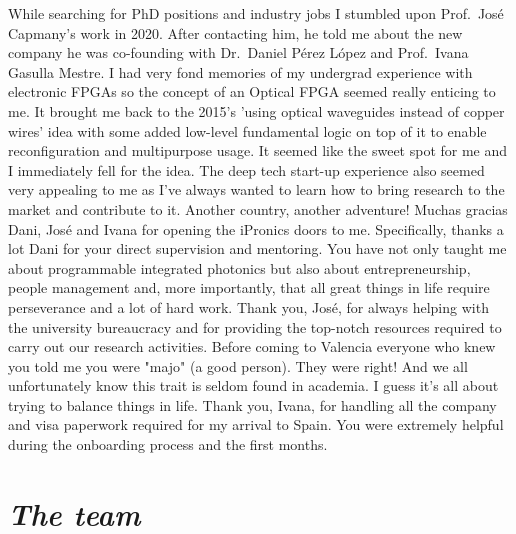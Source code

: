 While searching for PhD positions and industry jobs I stumbled upon Prof.~José Capmany's work in 2020.
After contacting him, he told me about the new company he was co-founding with Dr.~Daniel Pérez López and Prof.~Ivana Gasulla Mestre.
I had very fond memories of my undergrad experience with electronic FPGAs so the concept of an Optical FPGA seemed really enticing to me.
It brought me back to the 2015's 'using optical waveguides instead of copper wires' idea with some added low-level fundamental logic on top of it to enable reconfiguration and multipurpose usage.
It seemed like the sweet spot for me and I immediately fell for the idea.
The deep tech start-up experience also seemed very appealing to me as I've always wanted to learn how to bring research to the market and contribute to it.
Another country, another adventure!
Muchas gracias Dani, José and Ivana for opening the iPronics doors to me.
Specifically, thanks a lot Dani for your direct supervision and mentoring.
You have not only taught me about programmable integrated photonics but also about entrepreneurship, people management and, more importantly, that all great things in life require perseverance and a lot of hard work.
Thank you, José, for always helping with the university bureaucracy and for providing the top-notch resources required to carry out our research activities.
Before coming to Valencia everyone who knew you told me you were "majo" (a good person).
They were right!
And we all unfortunately know this trait is seldom found in academia.
I guess it's all about trying to balance things in life.
Thank you, Ivana, for handling all the company and visa paperwork required for my arrival to Spain.
You were extremely helpful during the onboarding process and the first months.

\section*{\textit{The team}}

